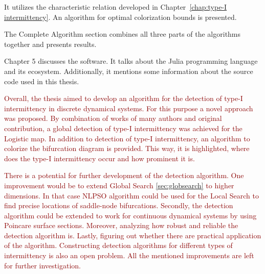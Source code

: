 It utilizes the characteristic relation developed in Chapter~\ref{chap:type-I intermittency}.
An algorithm for optimal colorization bounds is presented.
\par
The Complete Algorithm section combines all three parts of the algorithms together and presents results.
\par
Chapter 5 discusses the software.
It talks about the Julia programming language and its ecosystem.
Additionally, it mentions some information about the source code used in this thesis.
\par
\textcolor{darkred}{
Overall, the thesis aimed to develop an algorithm for the detection of type-I intermittency in discrete dynamical systems.
For this purpose a novel approach was proposed.
By combination of works of many authors and original contribution, a global detection of type-I intermittency was achieved for the Logistic map.
In addition to detection of type-I intermittency, an algorithm to colorize the bifurcation diagram is provided.
This way, it is highlighted, where does the type-I intermittency occur and how prominent it is.
}
\par
\textcolor{darkred}{
There is a potential for further development of the detection algorithm.
One improvement would be to extend Global Search \ref{sec:globsearch} to higher dimensions.
In that case NLPSO algorithm could be used for the Local Search to find precise locations of saddle-node bifurcations.
Secondly, the detection algorithm could be extended to work for continuous dynamical systems by using Poincare surface sections.
Moreover, analyzing how robust and reliable the detection algorithm is.
Lastly, figuring out whether there are practical application of the algorithm.
Constructing detection algorithms for different types of intermittency is also an open problem.
All the mentioned improvements are left for further investigation.
}

\endinput